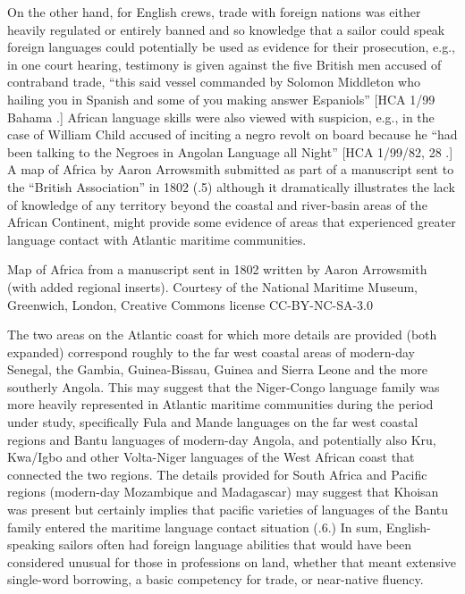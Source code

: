   On the other hand, for English crews, trade with foreign nations was either heavily regulated or entirely banned and so knowledge that a sailor could speak foreign languages could potentially be used as evidence for their prosecution, e.g., in one court hearing, testimony is given against the five British men accused of contraband trade, “this said vessel commanded by Solomon Middleton who hailing you in Spanish and some of you making answer Espaniols” [HCA 1/99 Bahama \citealt{Islands1722}.] African language skills were also viewed with suspicion, e.g., in the case of William Child accused of inciting a negro revolt on board because he “had been talking to the Negroes in Angolan Language all Night” [HCA 1/99/82, 28 \citealt{March1722}.] A map of Africa by Aaron Arrowsmith submitted as part of a manuscript sent to the “British Association” in 1802 (.5) although it dramatically illustrates the lack of knowledge of any territory beyond the coastal and river-basin areas of the African Continent, might provide some evidence of areas that experienced greater language contact with Atlantic maritime communities. 

 

 Map of Africa from a manuscript sent in 1802 written by Aaron Arrowsmith (with added regional inserts). Courtesy of the National Maritime Museum, Greenwich, London, Creative Commons license CC-BY-NC-SA-3.0

The two areas on the Atlantic coast for which more details are provided (both expanded) correspond roughly to the far west coastal areas of modern-day Senegal, the Gambia, Guinea-Bissau, Guinea and Sierra Leone and the more southerly Angola. This may suggest that the Niger-Congo language family was more heavily represented in Atlantic maritime communities during the period under study, specifically Fula and Mande languages on the far west coastal regions and Bantu languages of modern-day Angola, and potentially also Kru, Kwa/Igbo and other Volta-Niger languages of the West African coast that connected the two regions. The details provided for South Africa and Pacific regions (modern-day Mozambique and Madagascar) may suggest that Khoisan was present but certainly implies that pacific varieties of languages of the Bantu family entered the maritime language contact situation (.6.) In sum, English-speaking sailors often had foreign language abilities that would have been considered unusual for those in professions on land, whether that meant extensive single-word borrowing, a basic competency for trade, or near-native fluency. 

